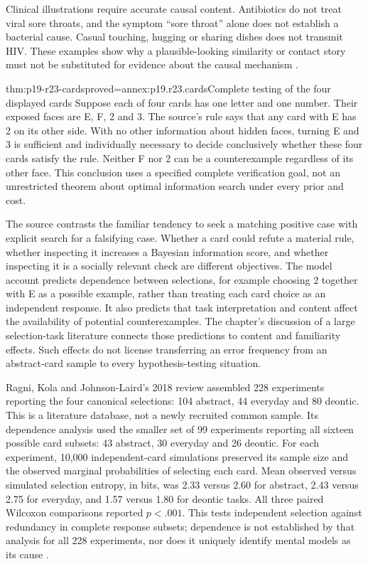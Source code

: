 Clinical illustrations require accurate causal content. Antibiotics do
not treat viral sore throats, and the symptom ``sore throat'' alone does
not establish a bacterial cause. Casual touching, hugging or sharing
dishes does not transmit HIV. These examples show why a plausible-looking
similarity or contact story must not be substituted for evidence about
the causal mechanism \cite{CDC2015Antibiotics,CDC2016HIVStigma}.

\begin{hbtheorem}{thm:p19-r23-cards}{proved=annex:p19.r23.cards}{Complete testing of the four displayed cards}
Suppose each of four cards has one letter and one number. Their exposed
faces are E, F, 2 and 3. The source's rule says that any card with E has
2 on its other side. With no other information about hidden faces,
turning E and 3
is sufficient and individually necessary to decide conclusively whether
these four cards satisfy the rule. Neither F nor 2 can be a counterexample
regardless of its other face. This conclusion uses a specified complete
verification goal, not an unrestricted theorem about optimal information
search under every prior and cost.
\end{hbtheorem}

The source contrasts the familiar tendency to seek a matching positive
case with explicit search for a falsifying case. Whether a card could
refute a material rule, whether inspecting it increases a Bayesian
information score, and whether inspecting it is a socially relevant
check are different objectives. The model account predicts dependence
between selections, for example choosing 2 together with E as a possible
example, rather than treating each card choice as an independent response.
It also predicts that task interpretation and content affect the
availability of potential counterexamples. The chapter's discussion of a
large selection-task literature connects those predictions to content
and familiarity effects. Such effects do not license transferring an error
frequency from an abstract-card sample to every hypothesis-testing situation.

Ragni, Kola and Johnson-Laird's 2018 review assembled 228 experiments
reporting the four canonical selections: 104 abstract, 44 everyday and
80 deontic. This is a literature database, not a newly recruited common
sample. Its dependence analysis used the smaller set of 99 experiments
reporting all sixteen possible card subsets: 43 abstract, 30 everyday
and 26 deontic. For each experiment, 10,000 independent-card simulations
preserved its sample size and the observed marginal probabilities of
selecting each card. Mean observed versus simulated selection entropy,
in bits, was 2.33 versus 2.60 for abstract, 2.43 versus 2.75 for everyday,
and 1.57 versus 1.80 for deontic tasks. All three paired Wilcoxon
comparisons reported \(p<.001\). This tests independent selection
against redundancy in complete response subsets; dependence is not
established by that analysis for all 228 experiments, nor does it
uniquely identify mental models as its cause
\cite[pp.~783--786, Tables~1--3]{RagniKolaJohnsonLaird2018Selection}.

